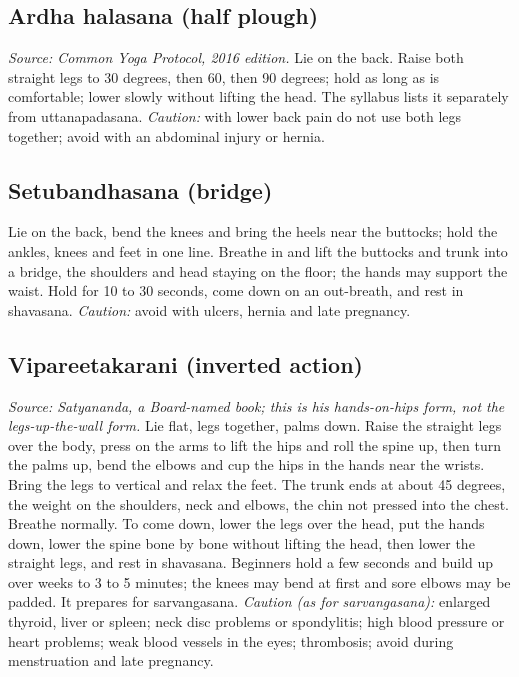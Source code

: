 \subsection*{Ardha halasana (half plough)}
\textit{Source: Common Yoga Protocol, 2016 edition.} Lie on the back. Raise both straight legs to 30 degrees, then 60, then 90 degrees; hold as long as is comfortable; lower slowly without lifting the head. The syllabus lists it separately from uttanapadasana.
\textit{Caution:} with lower back pain do not use both legs together; avoid with an abdominal injury or hernia.

\subsection*{Setubandhasana (bridge)}
Lie on the back, bend the knees and bring the heels near the buttocks; hold the ankles, knees and feet in one line. Breathe in and lift the buttocks and trunk into a bridge, the shoulders and head staying on the floor; the hands may support the waist. Hold for 10 to 30 seconds, come down on an out-breath, and rest in shavasana.
\textit{Caution:} avoid with ulcers, hernia and late pregnancy.

\subsection*{Vipareetakarani (inverted action)}
\textit{Source: Satyananda, a Board-named book; this is his hands-on-hips form, not the legs-up-the-wall form.} Lie flat, legs together, palms down. Raise the straight legs over the body, press on the arms to lift the hips and roll the spine up, then turn the palms up, bend the elbows and cup the hips in the hands near the wrists. Bring the legs to vertical and relax the feet. The trunk ends at about 45 degrees, the weight on the shoulders, neck and elbows, the chin not pressed into the chest. Breathe normally. To come down, lower the legs over the head, put the hands down, lower the spine bone by bone without lifting the head, then lower the straight legs, and rest in shavasana. Beginners hold a few seconds and build up over weeks to 3 to 5 minutes; the knees may bend at first and sore elbows may be padded. It prepares for sarvangasana.
\textit{Caution (as for sarvangasana):} enlarged thyroid, liver or spleen; neck disc problems or spondylitis; high blood pressure or heart problems; weak blood vessels in the eyes; thrombosis; avoid during menstruation and late pregnancy.

